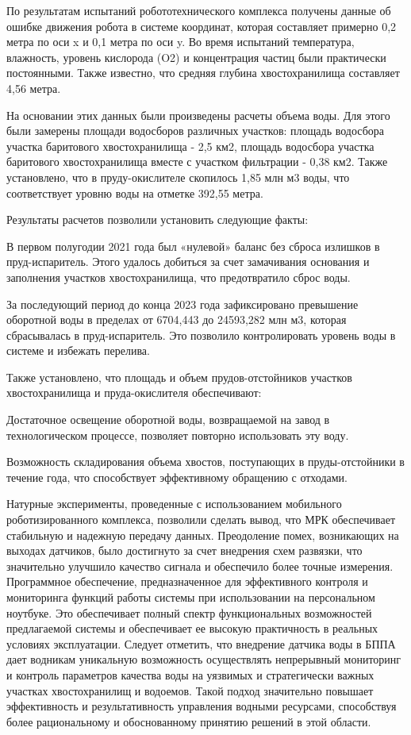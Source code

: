 По результатам испытаний робототехнического комплекса получены данные об
ошибке движения робота в системе координат, которая составляет примерно
0,2 метра по оси x и 0,1 метра по оси y. Во время испытаний температура,
влажность, уровень кислорода (O2) и концентрация частиц были практически
постоянными. Также известно, что средняя глубина хвостохранилища
составляет 4,56 метра.

На основании этих данных были произведены расчеты объема воды. Для этого
были замерены площади водосборов различных участков: площадь водосбора
участка баритового хвостохранилища - 2,5 км2, площадь водосбора участка
баритового хвостохранилища вместе с участком фильтрации - 0,38 км2.
Также установлено, что в пруду-окислителе скопилось 1,85 млн м3 воды,
что соответствует уровню воды на отметке 392,55 метра.

Результаты расчетов позволили установить следующие факты:

В первом полугодии 2021 года был «нулевой» баланс без сброса излишков в
пруд-испаритель. Этого удалось добиться за счет замачивания основания и
заполнения участков хвостохранилища, что предотвратило сброс воды.

За последующий период до конца 2023 года зафиксировано превышение
оборотной воды в пределах от 6704,443 до 24593,282 млн м3, которая
сбрасывалась в пруд-испаритель. Это позволило контролировать уровень
воды в системе и избежать перелива.

Также установлено, что площадь и объем прудов-отстойников участков
хвостохранилища и пруда-окислителя обеспечивают:

Достаточное освещение оборотной воды, возвращаемой на завод в
технологическом процессе, позволяет повторно использовать эту воду.

Возможность складирования объема хвостов, поступающих в пруды-отстойники
в течение года, что способствует эффективному обращению с отходами.

Натурные эксперименты, проведенные с использованием мобильного
роботизированного комплекса, позволили сделать вывод, что МРК
обеспечивает стабильную и надежную передачу данных. Преодоление помех,
возникающих на выходах датчиков, было достигнуто за счет внедрения схем
развязки, что значительно улучшило качество сигнала и обеспечило более
точные измерения. Программное обеспечение, предназначенное для
эффективного контроля и мониторинга функций работы системы при
использовании на персональном ноутбуке. Это обеспечивает полный спектр
функциональных возможностей предлагаемой системы и обеспечивает ее
высокую практичность в реальных условиях эксплуатации. Следует отметить,
что внедрение датчика воды в БППА дает водникам уникальную возможность
осуществлять непрерывный мониторинг и контроль параметров качества воды
на уязвимых и стратегически важных участках хвостохранилищ и водоемов.
Такой подход значительно повышает эффективность и результативность
управления водными ресурсами, способствуя более рациональному и
обоснованному принятию решений в этой области.

